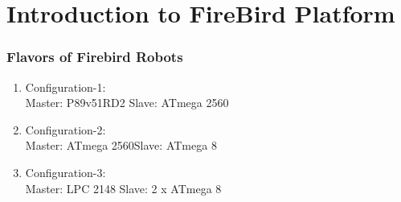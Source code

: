 \documentclass[10pt,red]{beamer}
\begin{document}

\section{Introduction to FireBird Platform}
\begin{frame}
	\frametitle{Flavors of Firebird Robots} \pause
	\begin{enumerate}
		\item<+-|alert@+> Configuration-1: \\ Master: P89v51RD2\qquad \hspace{7pt} Slave: ATmega 2560  
		\item<+-|alert@+> Configuration-2: \\ Master: ATmega 2560\qquad Slave: ATmega 8 		
		\item<+-|alert@+> Configuration-3: \\ Master: LPC 2148\qquad \hspace{12pt} Slave: 2 x ATmega 8 
	\end{enumerate}
\end{frame}
\end{document}

